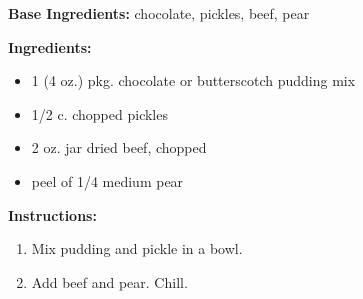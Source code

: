\begin{tcolorbox}[recipebox={Dried Beef And Pear Salad}]
	\textbf{Base Ingredients:} chocolate, pickles, beef, pear

	\vspace{0.5em}
	\textbf{Ingredients:}
	\begin{itemize}
		\item 1 (4 oz.) pkg. chocolate or butterscotch pudding mix
		\item 1/2 c. chopped pickles
		\item 2 oz. jar dried beef, chopped
		\item peel of 1/4 medium pear
	\end{itemize}

	\vspace{0.5em}
	\textbf{Instructions:}
	\begin{enumerate}
		\item Mix pudding and pickle in a bowl.
		\item Add beef and pear. Chill.
	\end{enumerate}
\end{tcolorbox}